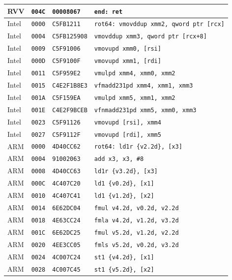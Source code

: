 \begin{table}[htbp]
\begin{tabular}{@{}l|l|l|p{7.2cm}@{}}
RVV & \texttt{004C} & \texttt{00008067} & \texttt{end: ret} \\
\midrule
Intel & \texttt{0000} & \texttt{C5FB1211} & \texttt{rot64: vmovddup xmm2, qword ptr [rcx]} \\
Intel & \texttt{0004} & \texttt{C5FB125908} & \texttt{vmovddup xmm3, qword ptr [rcx+8]} \\
Intel & \texttt{0009} & \texttt{C5F91006} & \texttt{vmovupd xmm0, [rsi]} \\
Intel & \texttt{000D} & \texttt{C5F9100F} & \texttt{vmovupd xmm1, [rdi]} \\
Intel & \texttt{0011} & \texttt{C5F959E2} & \texttt{vmulpd xmm4, xmm0, xmm2} \\
Intel & \texttt{0015} & \texttt{C4E2F1B8E3} & \texttt{vfmadd231pd xmm4, xmm1, xmm3} \\
Intel & \texttt{001A} & \texttt{C5F159EA} & \texttt{vmulpd xmm5, xmm1, xmm2} \\
Intel & \texttt{001E} & \texttt{C4E2F9BCEB} & \texttt{vfnmadd231pd xmm5, xmm0, xmm3} \\
Intel & \texttt{0023} & \texttt{C5F91126} & \texttt{vmovupd [rsi], xmm4} \\
Intel & \texttt{0027} & \texttt{C5F9112F} & \texttt{vmovupd [rdi], xmm5} \\
\midrule
ARM & \texttt{0000} & \texttt{4D40CC62} & \texttt{rot64: ld1r \{v2.2d\}, [x3]} \\
ARM & \texttt{0004} & \texttt{91002063} & \texttt{add x3, x3, \#8} \\
ARM & \texttt{0008} & \texttt{4D40CC63} & \texttt{ld1r \{v3.2d\}, [x3]} \\
ARM & \texttt{000C} & \texttt{4C407C20} & \texttt{ld1 \{v0.2d\}, [x1]} \\
ARM & \texttt{0010} & \texttt{4C407C41} & \texttt{ld1 \{v1.2d\}, [x2]} \\
ARM & \texttt{0014} & \texttt{6E62DC04} & \texttt{fmul v4.2d, v0.2d, v2.2d} \\
ARM & \texttt{0018} & \texttt{4E63CC24} & \texttt{fmla v4.2d, v1.2d, v3.2d} \\
ARM & \texttt{001C} & \texttt{6E62DC25} & \texttt{fmul v5.2d, v1.2d, v2.2d} \\
ARM & \texttt{0020} & \texttt{4EE3CC05} & \texttt{fmls v5.2d, v0.2d, v3.2d} \\
ARM & \texttt{0024} & \texttt{4C007C24} & \texttt{st1 \{v4.2d\}, [x1]} \\
ARM & \texttt{0028} & \texttt{4C007C45} & \texttt{st1 \{v5.2d\}, [x2]} \\
\bottomrule
\end{tabular}
\endgroup
\end{table}
\noindent{}\par
